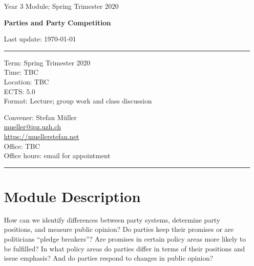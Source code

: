 \documentclass[abstract=on,parskip=full,headings=standardclasses,fontsize=11pt,paper=a4]{scrartcl}
\begin{document}
\singlespacing
\vspace{1cm}

\begin{center}
{\large Year 3 Module;  %
Spring Trimester 2020} \\ 
\bigskip

{\Large \textbf{Parties and Party Competition}} 
\bigskip


{\large  {Last update: \today}}\\
\bigskip

\end{center}

\vspace{1.5cm}



\hrule
\medskip
\begin{minipage}[t]{0.5\textwidth}
Term: Spring Trimester 2020 \\
Time: TBC \\
Location:  TBC \\
ECTS: 5.0 \\
Format: Lecture; group work and class discussion
\end{minipage}
\begin{minipage}[t]{0.49\textwidth}
\begin{flushright}
Convener: Stefan Müller \\
 \href{mailto:mueller@ipz.uzh.ch}{\textsf{mueller@ipz.uzh.ch}} \\
 \url{https://muellerstefan.net} \\
Office:  TBC \\
Office hours: email for appointment
\end{flushright}
\end{minipage}
\medskip
\hrule 

\section*{Module Description}

How can we  identify differences between party systems, determine party positions, and measure public opinion?  
Do parties keep their promises or are politicians ``pledge breakers''? Are promises in certain policy areas more likely to be fulfilled? In what policy areas do parties differ in terms of their positions and issue emphasis? And do parties respond to changes in public opinion?  
\end{document}
